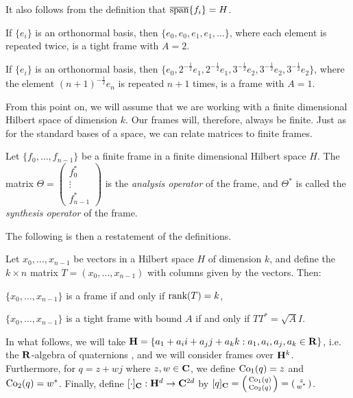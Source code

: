 \documentclass[../../../main]{subfiles}
\begin{document}
It also follows from the definition that $\overline{\text{span}}\{f_i\}=H$.

\begin{ex}
 If $\{e_i\}$ is an orthonormal basis, then $\{e_0,e_0,e_1,e_1,\dots\}$, where each element is repeated twice, is a tight frame with $A=2$.
\end{ex}

\begin{ex}
 If $\{e_i\}$ is an orthonormal basis, then $\{e_0,2^{-\frac{1}{2}}e_1,2^{-\frac{1}{2}}e_1,3^{-\frac{1}{2}}e_2,3^{-\frac{1}{2}}e_2,3^{-\frac{1}{2}}e_2\}$, where the element $(n+1)^{-\frac{1}{2}}e_n$ is repeated $n+1$ times, is a frame with $A=1$.
\end{ex}

From this point on, we will assume that we are working with a finite dimensional
Hilbert space of dimension $k$. Our frames will, therefore, always be finite.
Just as for the standard bases of a space, we can relate 
matrices to finite frames. 

\begin{defin}
 Let $\{f_0, \dots,f_{n-1}\}$ be a finite frame in a finite dimensional Hilbert space $H$. The matrix $\Theta=\left(\begin{smallmatrix} f_0^* \\ \vdots \\ f_{n-1}^* \end{smallmatrix}\right)$ is the {\it analysis operator} of the frame, and $\Theta^*$ is called the {\it synthesis operator} of the frame.
\end{defin}

The following is then a restatement of the definitions.

\begin{prop}
 Let $x_0,\dots,x_{n-1}$ be vectors in a Hilbert space $H$ of dimension $k$, and
 define the $k \times n$ matrix $T=( x_0,\dots, x_{n-1} )$ with columns given by
 the vectors. Then: 
 \begin{defenum}
  \item $\{x_0,\dots,x_{n-1}\}$ is a frame if and only if $\text{rank}(T)=k$,
  \item $\{x_0,\dots,x_{n-1}\}$ is a tight frame with bound $A$ if and only if
    $TT^*=\sqrt{A}I$. 
 \end{defenum}
\end{prop}

In what follows, we will take $\mathbf{H} = \{a_1 + a_ii + a_jj + a_kk :
a_1,a_i,a_j,a_k \in \mathbf{R}\}$, i.e. the $\mathbf{R}$-algebra of quaternions , and we will consider frames over $\mathbf{H}^k$. Furthermore, for $q=z+wj$ where $z,w \in \mathbf{C}$, we define $\text{Co}_1(q)=z$ and $\text{Co}_2(q)=w^*$. Finally, define $[\cdot]_{\mathbf{C}} : \mathbf{H}^d \rightarrow \mathbf{C}^{2d}$ by $[q]_{\mathbf{C}} = \left(\begin{smallmatrix} \text{Co}_1(q) \\ \text{Co}_2(q) \end{smallmatrix}\right) = \left(\begin{smallmatrix} z \\ w^* \end{smallmatrix}\right)$.
\end{document}
